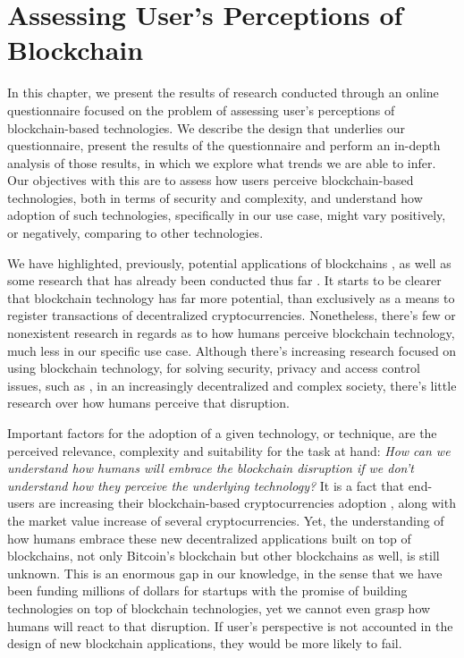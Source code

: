 \chapter{Assessing User's Perceptions of Blockchain}
\label{chap:study}


In this chapter, we present the results of research conducted through an online questionnaire focused on the problem of assessing user's perceptions of blockchain-based technologies. We describe the design that underlies our questionnaire, present the results of the questionnaire and perform an in-depth analysis of those results, in which we explore what trends we are able to infer. Our objectives with this are to assess how users perceive blockchain-based technologies, both in terms of security and complexity, and understand how adoption of such technologies, specifically in our use case, might vary positively, or negatively, comparing to other technologies.

We have highlighted, previously, potential applications of blockchains \cite{pilkington_blockchain_2016, crosby_blockchain_2016, underwood_blockchain_2016}, as well as some research that has already been conducted thus far \cite{biswas_securing_2016, ouaddah_fairaccess:_2017, fotiou_decentralized_2016}. It starts to be clearer that blockchain technology has far more potential, than exclusively as a means to register transactions of decentralized cryptocurrencies. Nonetheless, there's few or nonexistent research in regards as to how humans perceive blockchain technology, much less in our specific use case. Although there's increasing research focused on using blockchain technology, for solving security, privacy and access control issues, such as \cite{maesa_blockchain_2017, ouaddah_access_2017, dorri_blockchain_2017, yue_healthcare_2016}, in an increasingly decentralized and complex society, there's little research over how humans perceive that disruption.

Important factors for the adoption of a given technology, or technique, are the perceived relevance, complexity and suitability for the task at hand: \emph{How can we understand how humans will embrace the blockchain disruption if we don't understand how they perceive the underlying technology?} It is a fact that end-users are increasing their blockchain-based cryptocurrencies adoption \cite{bloomberg_crypto_central} \cite{bloomberg_crypto_altcoins} \cite{nyt_crypto_buble}, along with the market value increase of several cryptocurrencies. Yet, the understanding of how humans embrace these new decentralized applications built on top of blockchains, not only Bitcoin's blockchain but other blockchains as well, is still unknown. This is an enormous gap in our knowledge, in the sense that we have been funding millions of dollars for startups with the promise of building technologies on top of blockchain technologies, yet we cannot even grasp how humans will react to that disruption. If user's perspective is not accounted in the design of new blockchain applications, they would be more likely to fail.

